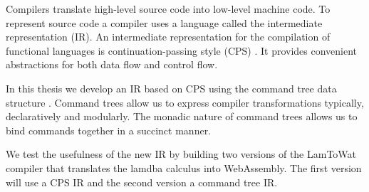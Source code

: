 
Compilers translate high-level source code into low-level machine code. To represent source code a compiler uses a language called the intermediate representation (IR). An intermediate representation for the compilation of functional languages is continuation-passing style (CPS)  \autocite{steele1978rabbit, DBLP:books/daglib/0022396}. It provides convenient abstractions for both data flow and control flow.

In this thesis we develop an IR based on CPS using the command tree data structure \autocite{commandtreespoulsen}. Command trees allow us to express compiler transformations typically, declaratively and modularly. The monadic nature of command trees allows us to bind commands together in a succinct manner.

We test the usefulness of the new IR by building two versions of the LamToWat compiler that translates the lamdba calculus into WebAssembly. The first version will use a CPS IR and the second version a command tree IR.